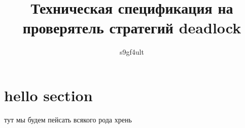\documentclass[a4paper]{article}
\author{s9gf4ult}
\title{Техническая спецификация на проверятель стратегий deadlock}
\begin{document}
\maketitle
\tableofcontents
\section{hello section}
тут мы будем пейсать всякого рода хрень
\end{document}
